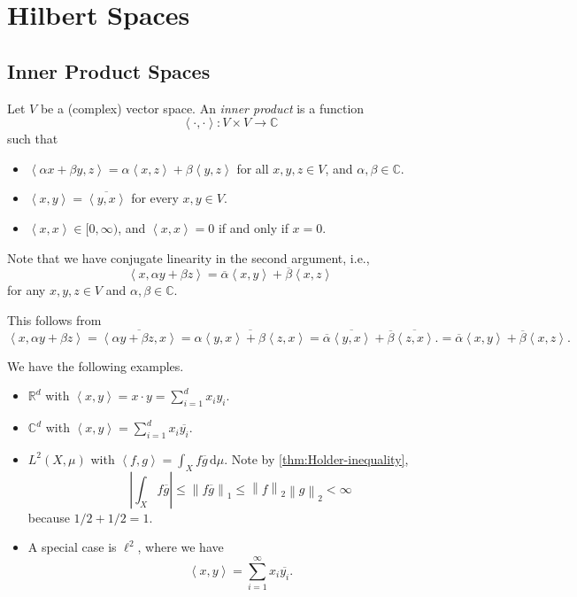 \chapter{Hilbert Spaces}\label{ch:Hilbert-Spaces}
\section{Inner Product Spaces}
\begin{definition}\label{def:inner-product}
	Let \(V\) be a (complex) vector space. An \emph{inner product} is a function
	\[
		\left< \cdot,\cdot \right> \colon V \times V \to \mathbb{C}
	\]
	such that
	\begin{itemize}
		\item \(\left< \alpha x + \beta y, z \right> = \alpha \left< x , z \right> + \beta \left< y, z \right>\) for all \(x,y,z \in V\), and \(\alpha,\beta \in \mathbb{C}\).
		\item \(\left< x,y \right> = \overline{\left< y,x \right>}\) for every \(x,y \in V\).
		\item \(\left< x,x \right> \in [0,\infty)\), and \(\left< x,x \right> = 0\) if and only if \(x = 0\).
	\end{itemize}
\end{definition}
\begin{note}
	Note that we have conjugate linearity in the second argument, i.e.,
	\[
		\left< x, \alpha y + \beta z \right> = \overline{\alpha}\left< x,y \right> + \overline{\beta}\left< x,z \right>
	\]
	for any \(x,y,z \in V\) and \(\alpha,\beta \in \mathbb{C}\).
\end{note}
\begin{explanation}
	This follows from
	\[
		\left< x, \alpha y + \beta z \right>
		= \overline{\left< \alpha y + \beta z, x \right> }
		= \overline{\alpha \left< y, x \right> + \beta \left< z, x \right> }
		= \overline{\alpha} \overline{\left< y, x \right>} + \overline{\beta} \overline{\left< z, x \right>}.
		= \overline{\alpha} \left< x, y \right> + \overline{\beta} \left< x, z \right>.
	\]
\end{explanation}

\begin{eg}
	We have the following examples.
	\begin{itemize}
		\item \(\mathbb{R}^d\) with \(\left< x,y \right> = x \cdot y = \sum_{i=1}^d x_i y_i\).
		\item \(\mathbb{C}^d\) with \(\left< x,y \right> = \sum_{i=1}^d x_i \overline{y_i}\).
		\item \(L^2(X,\mu)\) with \(\left< f,g \right> = \int_X f\overline{g}\,\mathrm{d} \mu\). Note by \autoref{thm:Holder-inequality},
		      \[
			      \left\vert \int_X f \overline{g} \right\vert \leq \left\lVert f\overline{g}\right\rVert_1 \leq \left\lVert f\right\rVert_2 \left\lVert g\right\rVert_2 < \infty
		      \]
		      because \(1/2 + 1/2 = 1\).
		\item A special case is \(\ell^2\), where we have
		      \[
			      \left< x,y \right>  = \sum_{i=1}^\infty x_i\overline{y_i}.
		      \]
	\end{itemize}
\end{eg}

